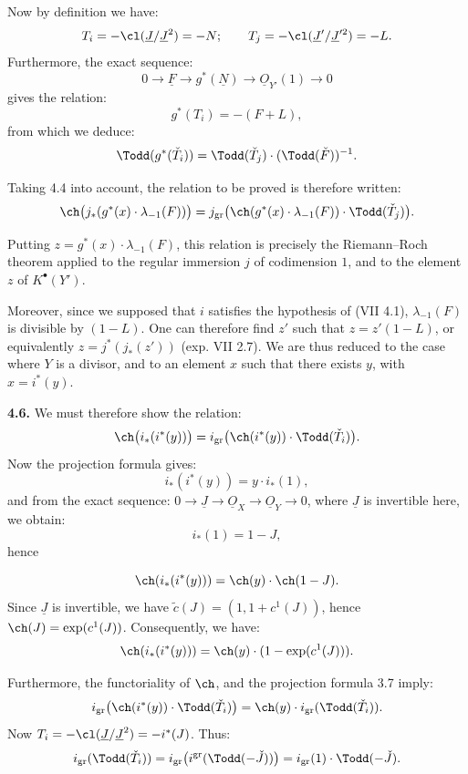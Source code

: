 %
Now by
definition we have:
\[
 T_i=-\cl(\underline{J}/\underline{J}^2)=-N;\qquad
 T_j=-\cl(\underline{J}'/\underline{J}'^2)=-L.
\]
Furthermore, the exact sequence:
\[
0\longrightarrow \underline{F}\longrightarrow g^*(\underline{N})\longrightarrow \underline{O}_{Y'}(1)\longrightarrow0
\]
gives the relation:
\[
 g^*(T_i)=-(F+L),
\]
from which we deduce:
\[
 \Todd(g^*(\check T_i))=\Todd(\check T_j)\cdot(\Todd(\check F))^{-1}.
\]

Taking 4.4 into account, the relation to be proved is therefore written:
\[
 \ch\bigl(j_*(g^*(x)\cdot\lambda_{-1}(F))\bigr)
 =
 j_{\mathrm{gr}}\bigl(\ch(g^*(x)\cdot\lambda_{-1}(F))\cdot\Todd(\check T_j)\bigr).
\]

Putting \(z=g^*(x)\cdot\lambda_{-1}(F)\), this relation is precisely the Riemann--Roch theorem applied to the regular immersion \(j\) of codimension \(1\), and to the element \(z\) of \(K^{\bullet}(Y')\).

Moreover, since we supposed that \(i\) satisfies the hypothesis of (VII 4.1), \(\lambda_{-1}(F)\) is divisible by \((1-L)\). One can therefore find \(z'\) such that \(z=z'(1-L)\), or equivalently \(z=j^*(j_*(z'))\) (exp. VII 2.7). We are thus reduced to the case where \(Y\) is a divisor, and to an element \(x\) such that there exists \(y\), with \(x=i^*(y)\).

\textbf{4.6.} We must therefore show the relation:
\[
 \ch\bigl(i_*(i^*(y))\bigr)
 =
 i_{\mathrm{gr}}\bigl(\ch(i^*(y))\cdot\Todd(\check T_i)\bigr).
\]
Now the projection formula gives:
\[
 i_*(i^*(y))=y\cdot i_*(1),
\]
and from the exact sequence: \(0\longrightarrow \underline{J}\longrightarrow\underline{O}_X\longrightarrow\underline{O}_Y\longrightarrow0\), where \(\underline{J}\) is invertible here, we obtain:
\[
 i_*(1)=1-J,
\]
hence

%
\[
 \ch(i_*(i^*(y)))=\ch(y)\cdot\ch(1-J).
\]
Since \(\underline{J}\) is invertible, we have \(\widetilde c(J)=(1,1+c^1(J))\), hence \(\ch(J)=\exp(c^1(J))\).
Consequently, we have:
\[
 \ch(i_*(i^*(y)))=\ch(y)\cdot(1-\exp(c^1(J))).
\]

Furthermore, the functoriality of \(\ch\), and the projection formula 3.7 imply:
\[
 i_{\mathrm{gr}}\bigl(\ch(i^*(y))\cdot\Todd(\check T_i)\bigr)
 =
 \ch(y)\cdot i_{\mathrm{gr}}(\Todd(\check T_i)).
\]
Now \(T_i=-\cl(\underline{J}/\underline{J}^2)=-i^*(J)\). Thus:
\[
 i_{\mathrm{gr}}(\Todd(\check T_i))
 =
 i_{\mathrm{gr}}\bigl(i^{\mathrm{gr}}(\Todd(-\check J))\bigr)
 =
 i_{\mathrm{gr}}(1)\cdot\Todd(-\check J).
\]

